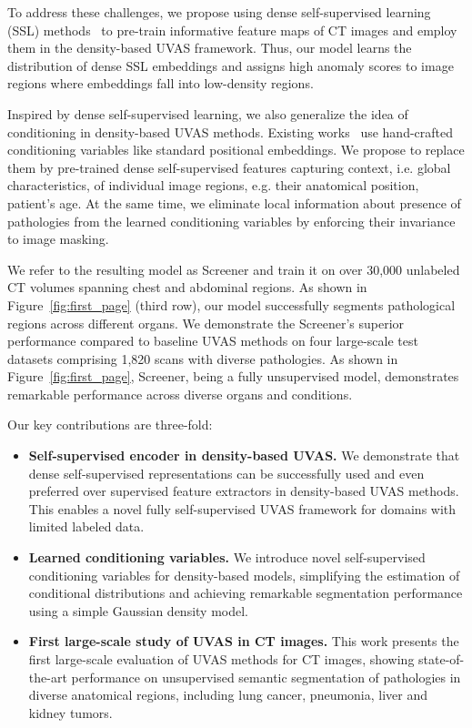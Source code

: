 To address these challenges, we propose using dense self-supervised learning (SSL) methods~\cite{vader,dense_cl,vicregl,vox2vec} to pre-train informative feature maps of CT images and employ them in the density-based UVAS framework. Thus, our model learns the distribution of dense SSL embeddings and assigns high anomaly scores to image regions where embeddings fall into low-density regions.

Inspired by dense self-supervised learning, we also generalize the idea of conditioning in density-based UVAS methods. Existing works~\cite{cflow,msflow} use hand-crafted conditioning variables like standard positional embeddings. We propose to replace them by pre-trained dense self-supervised features capturing context, i.e. global characteristics, of individual image regions, e.g. their anatomical position, patient's age. At the same time, we eliminate local information about presence of pathologies from the learned conditioning variables by enforcing their invariance to image masking.

We refer to the resulting model as Screener and train it on over 30,000 unlabeled CT volumes spanning chest and abdominal regions. As shown in Figure~\ref{fig:first_page} (third row), our model successfully segments pathological regions across different organs.
We demonstrate the Screener's superior performance compared to baseline UVAS methods on four large-scale test datasets comprising 1,820 scans with diverse pathologies. As shown in Figure~\ref{fig:first_page}, Screener, being a fully unsupervised model, demonstrates remarkable performance across diverse organs and conditions.

Our key contributions are three-fold:
\begin{itemize}
	\item \textbf{Self-supervised encoder in density-based UVAS.} We demonstrate that dense self-supervised representations can be successfully used and even preferred over supervised feature extractors in density-based UVAS methods. This enables a novel fully self-supervised UVAS framework for domains with limited labeled data.

	\item \textbf{Learned conditioning variables.} We introduce novel self-supervised conditioning variables for density-based models, simplifying the estimation of conditional distributions and achieving remarkable segmentation performance using a simple Gaussian density model.

	\item \textbf{First large-scale study of UVAS in CT images.} This work presents the first large-scale evaluation of UVAS methods for CT images, showing state-of-the-art performance on unsupervised semantic segmentation of pathologies in diverse anatomical regions, including lung cancer, pneumonia, liver and kidney tumors.
\end{itemize}
